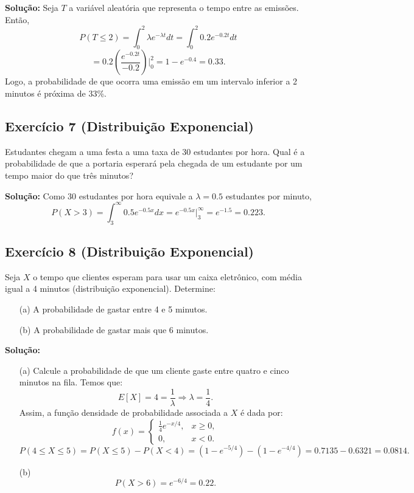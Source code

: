 \documentclass{article}
\begin{document}
\vspace{0.5cm}
\textbf{Solução:} 
Seja $T$ a variável aleatória que representa o tempo entre as emissões. Então,
    $$
    P(T \leq 2) = \int_0^2 \lambda e^{-\lambda t} dt = \int_0^2 0.2 e^{-0.2t} dt
    $$
    $$
    = 0.2 \left(\frac{e^{-0.2t}}{-0.2}\right)\bigg|_0^2 = 1 - e^{-0.4} = 0.33.
    $$
Logo, a probabilidade de que ocorra uma emissão em um intervalo inferior a 2 minutos é próxima de 33\%.

\subsection{Exercício 7 (Distribuição Exponencial)}
Estudantes chegam a uma festa a uma taxa de 30 estudantes por hora. Qual é a probabilidade de que a portaria esperará pela chegada de um estudante por um tempo maior do que três minutos?

\vspace{0.5cm}
\textbf{Solução:} Como 30 estudantes por hora equivale a $\lambda = 0.5$ estudantes por minuto,
    $$
    P(X > 3) = \int_3^\infty 0.5 e^{-0.5x} dx
    = e^{-0.5x}\biggr|_3^\infty
    = e^{-1.5}
    = 0.223.
    $$

\subsection{Exercício 8 (Distribuição Exponencial)}
Seja $X$ o tempo que clientes esperam para usar um caixa eletrônico, com média igual a 4 minutos (distribuição exponencial). Determine:
\begin{enumerate}
    \item[(a)] A probabilidade de gastar entre 4 e 5 minutos.
    \item[(b)] A probabilidade de gastar mais que 6 minutos.
\end{enumerate}

\vspace{0.5cm}
\textbf{Solução:}
\begin{enumerate}
    \item[(a)] Calcule a probabilidade de que um cliente gaste entre quatro e
cinco minutos na fila. Temos que:
        $$
        E[X] = 4 = \frac{1}{\lambda} \Rightarrow \lambda = \frac{1}{4}.
        $$
    Assim, a função densidade de probabilidade associada a $X$ é dada por:
        $$
        f(x) =
        \begin{cases}
        \frac{1}{4} e^{-x/4}, & x \ge 0,\\
        0, & x < 0.
        \end{cases}
        $$
        $$
        P(4 \le X \le 5) = P(X \le 5) - P(X < 4)
        = (1 - e^{-5/4}) - (1 - e^{-4/4})
        = 0.7135 - 0.6321
        = 0.0814.
        $$
    \item[(b)] 
        $$
        P(X > 6) = e^{-6/4}
        = 0.22.
        $$
\end{enumerate}
\end{document}
